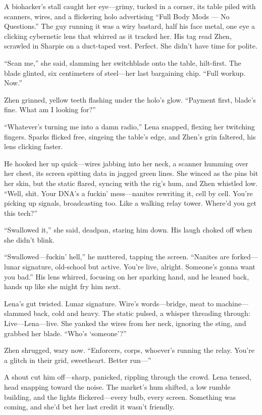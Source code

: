 \documentclass[12pt]{book}
\begin{document}
A biohacker’s stall caught her eye---grimy, tucked in a corner, its table piled with scanners, wires, and a flickering holo advertising ``Full Body Mods --- No Questions.'' The guy running it was a wiry bastard, half his face metal, one eye a clicking cybernetic lens that whirred as it tracked her. His tag read Zhen, scrawled in Sharpie on a duct-taped vest. Perfect. She didn’t have time for polite.

``Scan me,'' she said, slamming her switchblade onto the table, hilt-first. The blade glinted, six centimeters of steel---her last bargaining chip. ``Full workup. Now.''

Zhen grinned, yellow teeth flashing under the holo’s glow. ``Payment first, blade’s fine. What am I looking for?''

``Whatever’s turning me into a damn radio,'' Lena snapped, flexing her twitching fingers. Sparks flicked free, singeing the table’s edge, and Zhen’s grin faltered, his lens clicking faster.

He hooked her up quick---wires jabbing into her neck, a scanner humming over her chest, its screen spitting data in jagged green lines. She winced as the pins bit her skin, but the static flared, syncing with the rig’s hum, and Zhen whistled low. ``Well, shit. Your DNA’s a fuckin’ mess---nanites rewriting it, cell by cell. You’re picking up signals, broadcasting too. Like a walking relay tower. Where’d you get this tech?''

``Swallowed it,'' she said, deadpan, staring him down. His laugh choked off when she didn’t blink.

``Swallowed---fuckin’ hell,'' he muttered, tapping the screen. ``Nanites are forked---lunar signature, old-school but active. You’re live, alright. Someone’s gonna want you bad.'' His lens whirred, focusing on her sparking hand, and he leaned back, hands up like she might fry him next.

Lena’s gut twisted. Lunar signature. Wire’s words---bridge, meat to machine---slammed back, cold and heavy. The static pulsed, a whisper threading through: Live---Lena---live. She yanked the wires from her neck, ignoring the sting, and grabbed her blade. ``Who’s ‘someone’?''

Zhen shrugged, wary now. ``Enforcers, corps, whoever’s running the relay. You’re a glitch in their grid, sweetheart. Better run---''

A shout cut him off---sharp, panicked, rippling through the crowd. Lena tensed, head snapping toward the noise. The market’s hum shifted, a low rumble building, and the lights flickered---every bulb, every screen. Something was coming, and she’d bet her last credit it wasn’t friendly.
\end{document}
